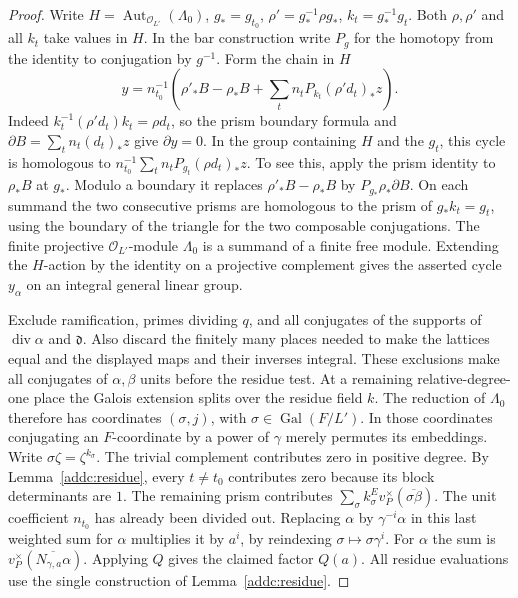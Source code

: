 \begin{proof}
Write \(H=\operatorname{Aut}_{\mathcal O_{L'}}(\Lambda_0)\),
\(g_*=g_{t_0}\), \(\rho'=g_*^{-1}\rho g_*\), \(k_t=g_*^{-1}g_t\).
Both \(\rho,\rho'\) and all \(k_t\) take values in \(H\).
In the bar construction write \(P_g\) for the homotopy from the
identity to conjugation by \(g^{-1}\). Form the chain in \(H\)
\[
 y=n_{t_0}^{-1}\left(\rho'_* B-\rho_* B+
           \sum_t n_t P_{k_t}(\rho'd_t)_*z\right).
\]
Indeed \(k_t^{-1}(\rho'd_t)k_t=\rho d_t\), so the prism boundary
formula and \(\partial B=\sum_t n_t(d_t)_*z\) give \(\partial y=0\).
In the group containing \(H\) and the \(g_t\), this cycle is
homologous to \(n_{t_0}^{-1}\sum_t n_t P_{g_t}(\rho d_t)_*z\).
To see this, apply the prism identity to \(\rho_*B\) at \(g_*\).
Modulo a boundary it replaces \(\rho'_*B-\rho_*B\) by
\(P_{g_*}\rho_*\partial B\). On each summand the two consecutive
prisms are homologous to the prism of \(g_*k_t=g_t\), using the
boundary of the triangle for the two composable conjugations.
The finite projective \(\mathcal O_{L'}\)-module \(\Lambda_0\)
is a summand of a finite free module. Extending the \(H\)-action
by the identity on a projective complement gives the asserted cycle
\(y_\alpha\) on an integral general linear group.

Exclude ramification, primes dividing \(q\), and all conjugates of
the supports of \(\operatorname{div}\alpha\) and \(\mathfrak d\).
Also discard the finitely many places needed to make the lattices
equal and the displayed maps and their inverses integral. These
exclusions make all conjugates of \(\alpha,\beta\) units before
the residue test. At a remaining relative-degree-one place the Galois extension
splits over the residue field \(k\). The reduction of \(\Lambda_0\)
therefore has coordinates \((\sigma,j)\), with
\(\sigma\in\operatorname{Gal}(F/L')\). In those coordinates conjugating
an \(F\)-coordinate by a power of \(\gamma\) merely permutes its
embeddings. Write \(\sigma\zeta=\zeta^{k_\sigma}\).
The trivial complement contributes zero in positive degree.
By Lemma~\ref{addc:residue}, every \(t\ne t_0\) contributes zero
because its block determinants are \(1\). The remaining prism
contributes \(\sum_\sigma k_\sigma^E v_P^\times(\overline{\sigma\beta})\).
The unit coefficient \(n_{t_0}\) has already been divided out.
Replacing \(\alpha\) by \(\gamma^{-i}\alpha\) in this last weighted
sum for \(\alpha\) multiplies it by \(a^i\), by reindexing
\(\sigma\mapsto\sigma\gamma^i\). For \(\alpha\) the sum is
\(v_P^\times(\overline{N_{\gamma,a}\alpha})\).
Applying \(Q\) gives the claimed factor \(Q(a)\). All residue
evaluations use the single construction of Lemma~\ref{addc:residue}.
\end{proof}

